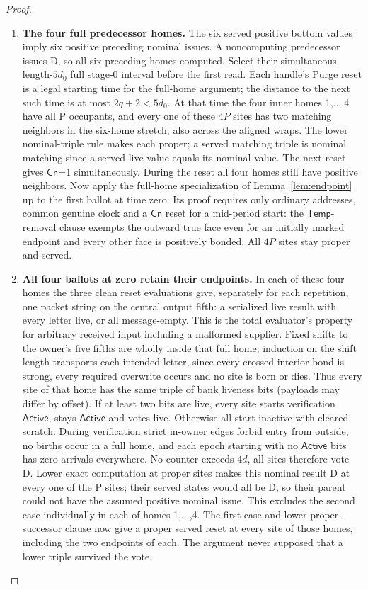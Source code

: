 \begin{proof}
\begin{enumerate}
\item \textbf{The four full predecessor homes.} The six served positive bottom values imply six positive preceding nominal issues. A noncomputing predecessor issues D, so all six preceding homes computed. Select their simultaneous length-\(5d_0\) full stage-0 interval before the first read. Each handle's Purge reset is a legal starting time for the full-home argument; the distance to the next such time is at most \(2q+2<5d_0\). At that time the four inner homes 1,...,4 have all P occupants, and every one of these \(4P\) sites has two matching neighbors in the six-home stretch, also across the aligned wraps. The lower nominal-triple rule makes each proper; a served matching triple is nominal matching since a served live value equals its nominal value. The next reset gives \(\mathsf{Cn}\)=1 simultaneously. During the reset all four homes still have positive neighbors. Now apply the full-home specialization of Lemma~\ref{lem:endpoint} up to the first ballot at time zero. Its proof requires only ordinary addresses, common genuine clock and a \(\mathsf{Cn}\) reset for a mid-period start: the \(\mathsf{Temp}\)-removal clause exempts the outward true face even for an initially marked endpoint and every other face is positively bonded. All \(4P\) sites stay proper and served.
\item \textbf{All four ballots at zero retain their endpoints.} In each of these four homes the three clean reset evaluations give, separately for each repetition, one packet string on the central output fifth: a serialized live result with every letter live, or all message-empty. This is the total evaluator's property for arbitrary received input including a malformed supplier. Fixed shifts to the owner's five fifths are wholly inside that full home; induction on the shift length transports each intended letter, since every crossed interior bond is strong, every required overwrite occurs and no site is born or dies. Thus every site of that home has the same triple of bank liveness bits (payloads may differ by offset). If at least two bits are live, every site starts verification \(\mathsf{Active}\), stays \(\mathsf{Active}\) and votes live. Otherwise all start inactive with cleared scratch. During verification strict in-owner edges forbid entry from outside, no births occur in a full home, and each epoch starting with no \(\mathsf{Active}\) bits has zero arrivals everywhere. No counter exceeds \(4d\), all sites therefore vote D. Lower exact computation at proper sites makes this nominal result D at every one of the P sites; their served states would all be D, so their parent could not have the assumed positive nominal issue. This excludes the second case individually in each of homes 1,...,4. The first case and lower proper-successor clause now give a proper served reset at every site of those homes, including the two endpoints of each. The argument never supposed that a lower triple survived the vote.

\end{enumerate}
\end{proof}
